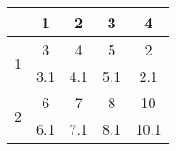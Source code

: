 \documentclass{article}
\begin{document}
\begin{tabular}{ccccc|}\cline{2-5}
&\multicolumn{1}{|c}{1} & 2 & 3 & 4 \\\hline
\multicolumn{1}{|c|}{\multirow{2}{*}{1}} & 3 & 4 & 5 & 2 \\
\multicolumn{1}{|c|}{} & 3.1 & 4.1 & 5.1 & 2.1 \\
\hline
\multicolumn{1}{|c|}{\multirow{2}{*}{2}} & 6 & 7 & 8 & 10 \\
\multicolumn{1}{|c|}{} & 6.1 & 7.1 & 8.1 & 10.1 \\
\hline
\end{tabular}
\end{document}
